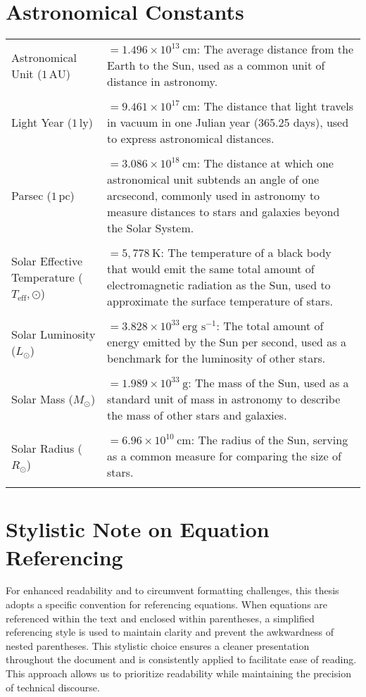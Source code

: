 \documentclass[main.tex]{subfiles}
\begin{document}
\section*{Astronomical Constants}
\begin{longtable}{p{} p{}}
    Astronomical Unit ($1\,\text{AU}$) & $= 1.496 \times 10^{13}\ \text{cm}$: The average distance from the Earth to the Sun, used as a common unit of distance in astronomy. \\\\
    Light Year ($1\,\text{ly}$) & $= 9.461 \times 10^{17}\ \text{cm}$: The distance that light travels in vacuum in one Julian year (365.25 days), used to express astronomical distances. \\\\
    Parsec ($1\,\text{pc}$) & $= 3.086 \times 10^{18}\ \text{cm}$: The distance at which one astronomical unit subtends an angle of one arcsecond, commonly used in astronomy to measure distances to stars and galaxies beyond the Solar System. \\\\
    Solar Effective Temperature ($T_\mathrm{eff},\odot$) & $= 5,778\ \text{K}$: The temperature of a black body that would emit the same total amount of electromagnetic radiation as the Sun, used to approximate the surface temperature of stars. \\\\
    Solar Luminosity ($L_{\odot}$) & $= 3.828 \times 10^{33}\ \text{erg s}^{-1}$: The total amount of energy emitted by the Sun per second, used as a benchmark for the luminosity of other stars. \\\\
    Solar Mass ($M_{\odot}$) & $= 1.989 \times 10^{33}\ \text{g}$: The mass of the Sun, used as a standard unit of mass in astronomy to describe the mass of other stars and galaxies. \\\\
    Solar Radius ($R_{\odot}$) & $= 6.96 \times 10^{10}\ \text{cm}$: The radius of the Sun, serving as a common measure for comparing the size of stars. \\\\
\end{longtable}


\section*{Stylistic Note on Equation Referencing}
For enhanced readability and to circumvent formatting challenges, this thesis adopts a specific convention for referencing equations. When equations are referenced within the text and enclosed within parentheses, a simplified referencing style is used to maintain clarity and prevent the awkwardness of nested parentheses. This stylistic choice ensures a cleaner presentation throughout the document and is consistently applied to facilitate ease of reading. This approach allows us to prioritize readability while maintaining the precision of technical discourse.
\end{document}

